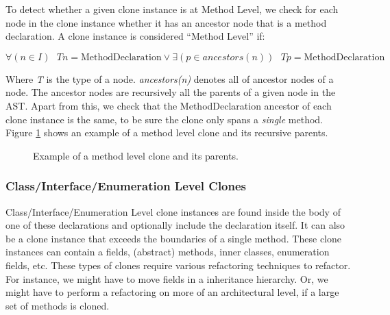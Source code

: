 To detect whether a given clone instance is at Method Level, we check for each node in the clone instance whether it has an ancestor node that is a method declaration. A clone instance is considered ``Method Level'' if:

\begin{equation}\label{eq:samemethod}
\forall (n \in I)\text{ } Tn = \text{MethodDeclaration} \lor \exists (p \in ancestors(n)) \text{ } Tp = \text{MethodDeclaration}
\end{equation}

Where \textit{T} is the type of a node. \textit{ancestors(n)} denotes all of ancestor nodes of a node. The ancestor nodes are recursively all the parents of a given node in the AST. Apart from this, we check that the MethodDeclaration ancestor of each clone instance is the same, to be sure the clone only spans a \textit{single} method. Figure \ref{fig:methodlevelclone} shows an example of a method level clone and its recursive parents.

\begin{figure}[H]
\begin{parcolumns}{2}
\end{parcolumns}
\caption{Example of a method level clone and its parents.}
\label{fig:methodlevelclone}
\end{figure}

\subsubsection{Class/Interface/Enumeration Level Clones}
Class/Interface/Enumeration Level clone instances are found inside the body of one of these declarations and optionally include the declaration itself. It can also be a clone instance that exceeds the boundaries of a single method. These clone instances can contain a fields, (abstract) methods, inner classes, enumeration fields, etc. These types of clones require various refactoring techniques to refactor. For instance, we might have to move fields in a inheritance hierarchy. Or, we might have to perform a refactoring on more of an architectural level, if a large set of methods is cloned.

